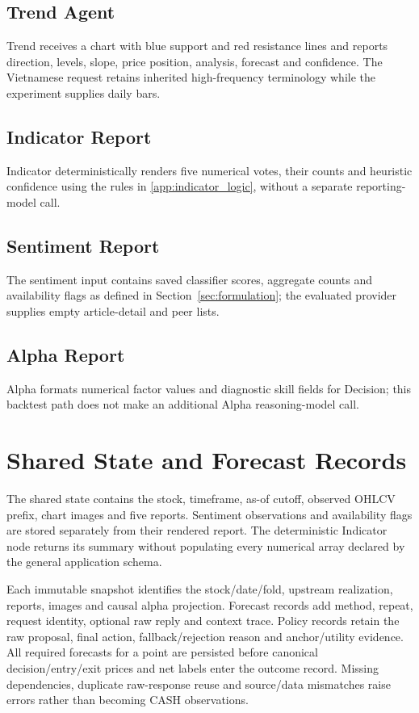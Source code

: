 \subsection{Trend Agent}
\label{app:prompt_trend}
Trend receives a chart with blue support and red resistance lines and reports direction, levels, slope, price position, analysis, forecast and confidence. The Vietnamese request retains inherited high-frequency terminology while the experiment supplies daily bars.

\subsection{Indicator Report}
\label{app:prompt_indicator}
Indicator deterministically renders five numerical votes, their counts and heuristic confidence using the rules in \ref{app:indicator_logic}, without a separate reporting-model call.

\subsection{Sentiment Report}
\label{app:prompt_sentiment}
The sentiment input contains saved classifier scores, aggregate counts and availability flags as defined in Section~\ref{sec:formulation}; the evaluated provider supplies empty article-detail and peer lists.

\subsection{Alpha Report}
\label{app:prompt_alpha}
Alpha formats numerical factor values and diagnostic skill fields for Decision; this backtest path does not make an additional Alpha reasoning-model call.

\FloatBarrier
\section{Shared State and Forecast Records}
\label{app:state_schema}
The shared state contains the stock, timeframe, as-of cutoff, observed OHLCV prefix, chart images and five reports. Sentiment observations and availability flags are stored separately from their rendered report. The deterministic Indicator node returns its summary without populating every numerical array declared by the general application schema.

Each immutable snapshot identifies the stock/date/fold, upstream realization, reports, images and causal alpha projection. Forecast records add method, repeat, request identity, optional raw reply and context trace. Policy records retain the raw proposal, final action, fallback/rejection reason and anchor/utility evidence. All required forecasts for a point are persisted before canonical decision/entry/exit prices and net labels enter the outcome record. Missing dependencies, duplicate raw-response reuse and source/data mismatches raise errors rather than becoming CASH observations.

